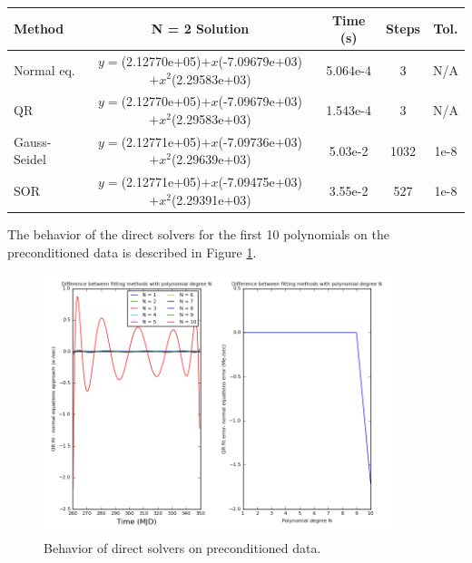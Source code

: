 \documentclass[10pt, preprint]{aastex}
\begin{document}
\begin{enumerate}
\begin{table}[!ht]
\centering
\begin{tabular}{l c c c c}
  \bf{Method} & \bf{N = 2 Solution} & \bf{Time (s)} & \bf{Steps} & \bf{Tol.}\\ \hline
  Normal eq. & $y=$(2.12770e+05)$+x$(-7.09679e+03)$+x^2$(2.29583e+03) & 5.064e-4 & 3 & N/A \\
  QR & $y=$(2.12770e+05)$+x$(-7.09679e+03)$+x^2$(2.29583e+03) & 1.543e-4 & 3 & N/A \\
  Gauss-Seidel &  $y=$(2.12771e+05)$+x$(-7.09736e+03)$+x^2$(2.29639e+03) & 5.03e-2 & 1032 & 1e-8\\
  SOR &  $y=$(2.12771e+05)$+x$(-7.09475e+03)$+x^2$(2.29391e+03) & 3.55e-2 & 527 & 1e-8\\
\end{tabular}
\end{table}
The behavior of the direct solvers for the first 10 polynomials on the preconditioned data is described in Figure \ref{fig2}.
\clearpage
\begin{figure}[!ht]
  \centering
  \includegraphics[width=4in]{hw6_fig1a.png}
  \caption{\centering Behavior of direct solvers on preconditioned data. \label{fig2}}
\end{figure}




\end{enumerate}
\end{document}
